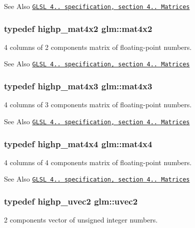 \begin{DoxySeeAlso}{See Also}
\href{http://www.opengl.org/registry/doc/GLSLangSpec.4.20.8.pdf}{\tt G\-L\-S\-L 4.. specification, section 4.. Matrices} 
\end{DoxySeeAlso}
\hypertarget{group__core__types_ga72cf8ec4f4cda85943f4683531e421bc}{
\subsubsection[{mat4x2}]{\setlength{\rightskip}{0pt plus 5cm}typedef highp\-\_\-mat4x2 {\bf glm\-::mat4x2}}}\label{group__core__types_ga72cf8ec4f4cda85943f4683531e421bc}
4 columns of 2 components matrix of floating-\/point numbers.

\begin{DoxySeeAlso}{See Also}
\href{http://www.opengl.org/registry/doc/GLSLangSpec.4.20.8.pdf}{\tt G\-L\-S\-L 4.. specification, section 4.. Matrices} 
\end{DoxySeeAlso}
\hypertarget{group__core__types_gad3f3f750dcdc74a9037342c5cae55f5e}{
\subsubsection[{mat4x3}]{\setlength{\rightskip}{0pt plus 5cm}typedef highp\-\_\-mat4x3 {\bf glm\-::mat4x3}}}\label{group__core__types_gad3f3f750dcdc74a9037342c5cae55f5e}
4 columns of 3 components matrix of floating-\/point numbers.

\begin{DoxySeeAlso}{See Also}
\href{http://www.opengl.org/registry/doc/GLSLangSpec.4.20.8.pdf}{\tt G\-L\-S\-L 4.. specification, section 4.. Matrices} 
\end{DoxySeeAlso}
\hypertarget{group__core__types_ga63e3ee9447ed593484140a9368e738ec}{
\subsubsection[{mat4x4}]{\setlength{\rightskip}{0pt plus 5cm}typedef highp\-\_\-mat4x4 {\bf glm\-::mat4x4}}}\label{group__core__types_ga63e3ee9447ed593484140a9368e738ec}
4 columns of 4 components matrix of floating-\/point numbers.

\begin{DoxySeeAlso}{See Also}
\href{http://www.opengl.org/registry/doc/GLSLangSpec.4.20.8.pdf}{\tt G\-L\-S\-L 4.. specification, section 4.. Matrices} 
\end{DoxySeeAlso}
\hypertarget{group__core__types_gafd2041b45eff671aa8899d2c2835eee9}{
\subsubsection[{uvec2}]{\setlength{\rightskip}{0pt plus 5cm}typedef highp\-\_\-uvec2 {\bf glm\-::uvec2}}}\label{group__core__types_gafd2041b45eff671aa8899d2c2835eee9}
2 components vector of unsigned integer numbers.

